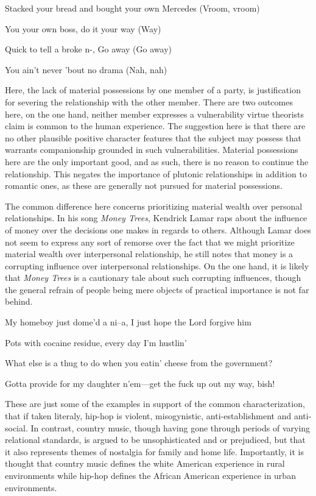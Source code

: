 \documentclass[
  letterpaper,
  DIV=11,
  numbers=noendperiod]{scrartcl}
\theoremstyle{remark}
\begin{document}
Stacked your bread and bought your own Mercedes (Vroom, vroom)

You your own boss, do it your way (Way)

Quick to tell a broke n-, Go away (Go away)

You ain't never 'bout no drama (Nah, nah)

Here, the lack of material possessions by one member of a party, is
justification for severing the relationship with the other member. There
are two outcomes here, on the one hand, neither member expresses a
vulnerability virtue theorists claim is common to the human experience.
The suggestion here is that there are no other plausible positive
character features that the subject may possess that warrants
companionship grounded in such vulnerabilities. Material possessions
here are the only important good, and as such, there is no reason to
continue the relationship. This negates the importance of plutonic
relationships in addition to romantic ones, as these are generally not
pursued for material possessions.

The common difference here concerns prioritizing material wealth over
personal relationships. In his song \emph{Money Trees}, Kendrick Lamar
raps about the influence of money over the decisions one makes in
regards to others. Although Lamar does not seem to express any sort of
remorse over the fact that we might prioritize material wealth over
interpersonal relationship, he still notes that money is a corrupting
influence over interpersonal relationships. On the one hand, it is
likely that \emph{Money Trees} is a cautionary tale about such
corrupting influences, though the general refrain of people being mere
objects of practical importance is not far behind.

My homeboy just dome'd a ni--a, I just hope the Lord forgive him

Pots with cocaine residue, every day I'm hustlin'

What else is a thug to do when you eatin' cheese from the government?

Gotta provide for my daughter n'em---get the fuck up out my way, bish!

These are just some of the examples in support of the common
characterization, that if taken literaly, hip-hop is violent,
misogynistic, anti-establishment and anti-social. In contrast, country
music, though having gone through periods of varying relational
standards, is argued to be unsophisticated and or prejudiced, but that
it also represents themes of nostalgia for family and home life.
Importantly, it is thought that country music defines the white American
experience in rural environments while hip-hop defines the African
American experience in urban environments.
\end{document}
